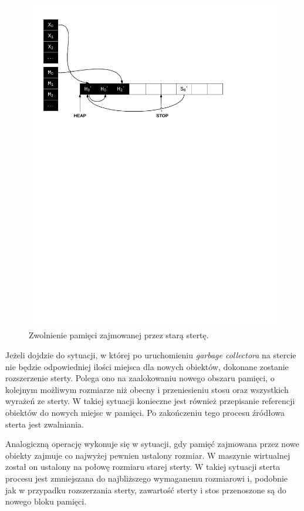 \begin{figure}[h]
\centerline{\includegraphics[scale=0.75, clip, trim=10mm 180mm 45mm 10mm]{gc_6}}
\caption{Zwolnienie pamięci zajmowanej przez starą stertę.}
\label{fig:gc6}
\end{figure}

Jeżeli dojdzie do sytuacji, w której po uruchomieniu \emph{garbage collectora} na stercie nie będzie odpowiedniej ilości miejsca dla nowych obiektów, dokonane zostanie rozszerzenie sterty. Polega ono na zaalokowaniu nowego obszaru pamięci, o kolejnym możliwym rozmiarze niż obecny i przeniesieniu stosu oraz wszystkich wyrażeń ze sterty.
W takiej sytuacji konieczne jest również przepisanie referencji obiektów do nowych miejsc w pamięci.
Po zakończeniu tego procesu źródłowa sterta jest zwalniania.

Analogiczną operację wykonuje się w sytuacji, gdy pamięć zajmowana przez nowe obiekty zajmuje co najwyżej pewnien ustalony rozmiar.
W maszynie wirtualnej został on ustalony na połowę rozmiaru starej sterty.
W takiej sytuacji sterta procesu jest zmniejszana do najbliższego wymaganemu rozmiarowi i, podobnie jak w przypadku rozszerzania sterty, zawartość sterty i stos przenoszone są do nowego bloku pamięci.


